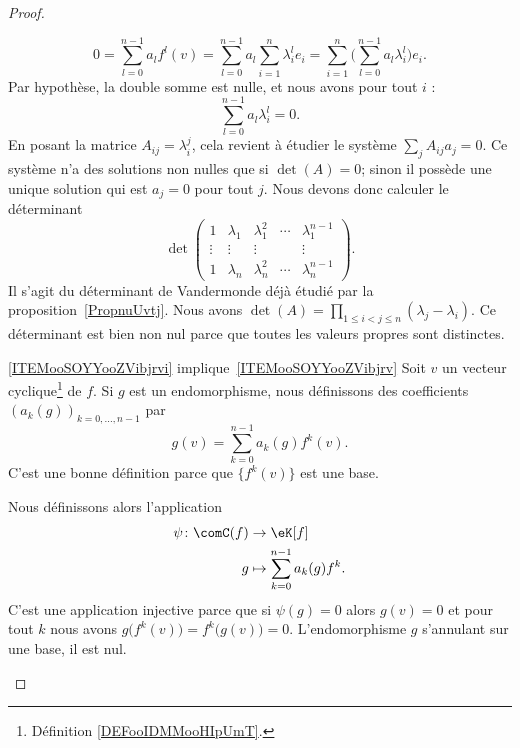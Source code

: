 \begin{proof}
\begin{subproof}
		\begin{equation}
			0=\sum_{l=0}^{n-1}a_lf^l(v)=\sum_{l=0}^{n-1}a_l\sum_{i=1}^n\lambda_i^le_i=\sum_{i=1}^n\Big( \sum_{l=0}^{n-1}a_l\lambda_i^l \Big)e_i.
		\end{equation}
		Par hypothèse, la double somme est nulle, et nous avons pour tout \( i\) :
		\begin{equation}
			\sum_{l=0}^{n-1}a_l\lambda_i^l=0.
		\end{equation}
		En posant la matrice \( A_{ij}=\lambda_i^j\), cela revient à étudier le système \( \sum_j A_{ij}a_j=0\). Ce système n'a des solutions non nulles que si \( \det(A)= 0\); sinon il possède une unique solution qui est \( a_j=0\) pour tout \( j\). Nous devons donc calculer le déterminant
		\begin{equation}
			\det\begin{pmatrix}
				1      & \lambda_1 & \lambda_1^2 & \cdots & \lambda_1^{n-1} \\
				\vdots & \vdots    & \vdots      &        & \vdots          \\
				1      & \lambda_n & \lambda_n^2 & \cdots & \lambda_n^{n-1}
			\end{pmatrix}.
		\end{equation}
		Il s'agit du déterminant de Vandermonde déjà étudié par la proposition~\ref{PropnuUvtj}. Nous avons \( \det(A)=\prod_{1\leq i<j\leq n}(\lambda_j-\lambda_i)\). Ce déterminant est bien non nul parce que toutes les valeurs propres sont distinctes.
		\item[\ref{ITEMooSOYYooZVibjrvi} implique~\ref{ITEMooSOYYooZVibjrv}]
		Soit \( v\) un vecteur cyclique\footnote{Définition \ref{DEFooIDMMooHIpUmT}.} de \( f\). Si \( g\) est un endomorphisme, nous définissons des coefficients \( (a_k(g))_{k=0,\ldots, n-1}\) par
		\begin{equation}
			g(v)=\sum_{k=0}^{n-1}a_k(g)f^k(v).
		\end{equation}
		C'est une bonne définition parce que \( \{ f^k(v) \} \) est une base.

		Nous définissons alors l'application
		\begin{equation}
			\begin{aligned}
				\psi\colon \comC(f) & \to \eK[f]                         \\
				g                   & \mapsto \sum_{k=0}^{n-1}a_k(g)f^k.
			\end{aligned}
		\end{equation}
		C'est une application injective parce que si \( \psi(g)=0\) alors \( g(v)=0\) et pour tout \( k\) nous avons \( g\big( f^k(v) \big)=f^k\big( g(v) \big)=0\). L'endomorphisme \( g\) s'annulant sur une base, il est nul.


\end{subproof}
\end{proof}

